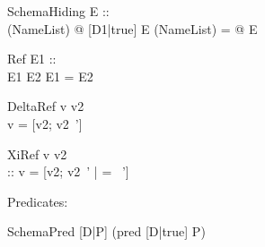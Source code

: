 \begin{zedrule}{SchemaHiding}
  E ::\power [D1| true] \\
  [D1|true]\hide (NameList) \is \exists [D2|true] @ [D1|true]
\derives
  E \hide (NameList) = \exists [D2|true] @ E
\end{zedrule}


\begin{zedrule}{Ref}
  E1 :: \power [D | true] \\
  E1 \hasDefn E2
\derives
  E1 = E2
\end{zedrule}

\begin{zedrule}{DeltaRef}
  \Delta \unprefix v \is v2 \\
\derives
  v = [v2; v2~']
\end{zedrule}

\begin{zedrule}{XiRef}
  \Xi \unprefix v \is v2 \\
  [v2|true] :: \power [D2 | true] 
\derives
  v = [v2; v2~' | \theta [D2|true] = \theta [D2|true]~']
\end{zedrule}


Predicates:

\begin{zedrule}{SchemaPred}
  [D|P] \iff (pred [D|true] \land P)
\end{zedrule}
